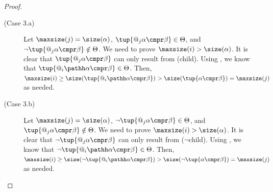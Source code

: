 \documentclass[10pt,a4paper]{amsart}
\theoremstyle{definition}
\theoremstyle{remark}
\begin{document}
\begin{proof}
\begin{description}
  
    \item[(Case 3.a)]
      Let $\maxsize(j) = \size(\alpha)$, $\tup{@_j\alpha \cmpr \beta} \in \Theta$, and $\lnot\tup{@_j\alpha \cmpr \beta} \notin \Theta$.
      We need to prove $\maxsize(i) > \size(\alpha)$.
      It is clear that $\tup{@_j\alpha \cmpr \beta}$ can only result from (child).
      Using , we know that $\tup{@_i\pathh\alpha \cmpr \beta} \in \Theta$.
      Then, $\maxsize(i) \geq \size(\tup{@_i\pathh\alpha \cmpr \beta}) > \size (\tup{\alpha \cmpr \beta}) = \maxsize(j)$ as needed.
    
    \item[(Case 3.b)]
      Let $\maxsize(j) = \size(\alpha)$, $\lnot\tup{@_j\alpha \cmpr \beta} \in \Theta$, and $\tup{@_j\alpha \cmpr \beta} \notin \Theta$.
      We need to prove $\maxsize(i) > \size(\alpha)$.
      It is clear that $\lnot\tup{@_j\alpha \cmpr \beta}$ can only result from ($\lnot$child).
      Using , we know that $\lnot\tup{@_i\pathh\alpha \cmpr \beta} \in \Theta$.
      Then, $\maxsize(i) \geq \size({\lnot\tup{@_i\pathh\alpha \cmpr \beta}}) > \size (\lnot\tup{\alpha \cmpr \beta}) = \maxsize(j)$ as needed. \qedhere



\end{description}
\end{proof}
\end{document}
